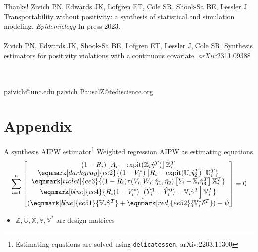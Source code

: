 \documentclass{beamer}
\begin{document}
\begin{frame}{Thanks!}
	Zivich PN, Edwards JK, Lofgren ET, Cole SR, Shook-Sa BE, Lessler J. Transportability without positivity: a synthesis of statistical and simulation modeling. \textit{Epidemiology} In-press 2023. \\~\\
	Zivich PN, Edwards JK, Shook-Sa BE, Lofgren ET, Lessler J, Cole SR. Synthesis estimators for positivity violations with a continuous covariate. \textit{arXiv}:2311.09388
	\\~\\~\\
	\begin{center}
		\faEnvelope \quad pzivich@unc.edu \quad 
		\faGithub \quad pzivich \quad 
		\faMastodon \quad PausalZ@fediscience.org
	\end{center}	
\end{frame}

\section{Appendix}

\begin{frame}{A synthesis AIPW estimator\footnote[frame]{Estimating equations are solved using \texttt{delicatessen}, arXiv:2203.11300}}
	Weighted regression AIPW as estimating equations
	\begin{equation*}
		\sum_{i=1}^{n}
		\begin{bmatrix}
			(1 - R_i) \left[A_i - \text{expit}(\mathbb{Z}_i \hat{\eta}_1^T)\right] \mathbb{Z}_i^T \\
			\eqnmark[darkgray]{ee2}{(1 - V^*_i) \left[R_i - \text{expit}(\mathbb{U}_i \hat{\eta}_2^T)\right] \mathbb{U}_i^T} \\
			\eqnmark[violet]{ee3}{(1 - R_i) \pi(V_i, W_i; \hat{\eta}_1, \hat{\eta}_2) \left[Y_i - \mathbb{X}_i \hat{\eta}_3^T\right] \mathbb{X}_i^T} \\
			\eqnmark[blue]{ee4}{R_i (1 - V_i^*) \left[ (\hat{Y}_i^1 - \hat{Y}_i^0) - \mathbb{V}_i \hat{\gamma}^T \right] \mathbb{V}_i^T} \\
			(\eqnmark[blue]{ee51}{\mathbb{V}_i \hat{\gamma}^T} + \eqnmark[red]{ee52}{\mathbb{V}_i^* \delta^T}) - \hat{\psi}
		\end{bmatrix} = 0
	\end{equation*}
	\begin{itemize}
		\item $\mathbb{Z}, \mathbb{U}, \mathbb{X}, \mathbb{V}, \mathbb{V}^*$ are design matrices
	\end{itemize}
\end{frame}
\end{document}
